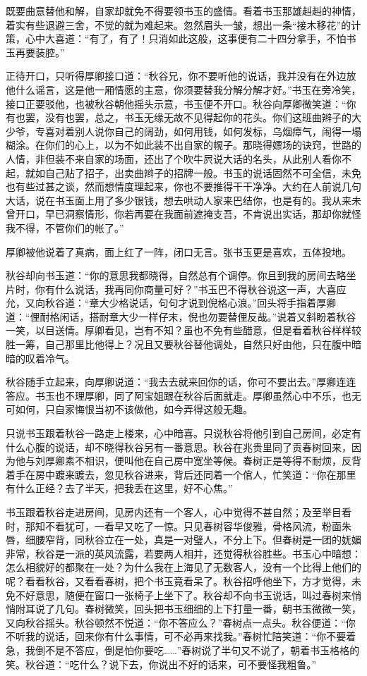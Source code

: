 \documentclass[12pt,UTF8]{ctexbook}
\begin{document}
{{{既要曲意替他和解，自家却就免不得要领书玉的盛情。看着书玉那雄赳赳的神情，着实有些退避三舍，不觉的就为难起来。忽然眉头一皱，想出一条“接木移花”的计策，心中大喜道：“有了，有了！只消如此这般，这事便有二十四分拿手，不怕书玉再要装腔。”

正待开口，只听得厚卿接口道：“秋谷兄，你不要听他的说话，我并没有在外边放他什么谣言，这是他一厢情愿的主意，你须要替我分解分解才好。”书玉在旁冷笑，接口正要驳他，也被秋谷朝他摇头示意，书玉便不开口。秋谷向厚卿微笑道：“你有也罢，没有也罢，总之，书玉无缘无故不见得起你的花头。你们这班曲辫子的大少爷，专喜对着别人说你自己的阔劲，如何用钱，如何发标，乌烟瘴气，闹得一塌糊涂。在你们的心上，以为不如此装不出自家的幌子。那晓得嫖场的诀窍，世路的人情，非但装不来自家的场面，还出了个吹牛屄说大话的名头，从此别人看你不起，就如自己贴了招子，出卖曲辫子的招牌一般。书玉的说话固然不可全信，未免也有些过甚之谈，然而想情度理起来，你也不要推得干干净净。大约在人前说几句大话，说在书玉面上用了多少银钱，想去哄动人家来巴结你，也是有的。我从来未曾开口，早已洞察情形，你若再要在我面前遮掩支吾，不肯说出实话，那却你就怪我不得，不管你们的帐了。”

厚卿被他说着了真病，面上红了一阵，闭口无言。张书玉更是喜欢，五体投地。

秋谷却向书玉道：“你的意思我都晓得，自然总有个调停。你且到我的房间去略坐片时，你有什么说话，我再同你商量可好？”书玉巴不得秋谷说这一声，大喜应允，又向秋谷道：“章大少格说话，句句才说到倪格心浪。”回头将手指着厚卿道：“俚耐格闲话，搭耐章大少一样仔末，倪也勿要替俚反哉。”说着又斜盼着秋谷一笑，以目送情。厚卿看见，岂有不知？虽也不免有些醋意，但是看着秋谷样样较胜一筹，自己那里比他得上？况且又要秋谷替他调处，自然只好由他，只在腹中暗暗的叹着冷气。

秋谷随手立起来，向厚卿说道：“我去去就来回你的话，你可不要出去。”厚卿连连答应。书玉也不理厚卿，同了阿宝姐跟在秋谷后面就走。厚卿虽然心中不乐，也无可如何，只自家悔恨当初不该做他，如今弄得这般无趣。

只说书玉跟着秋谷一路走上楼来，心中暗喜。只说秋谷将他引到自己房间，必定有什么心腹的说话，却不晓得秋谷另有一番意思。秋谷在兆贵里同了贡春树回来，因为他与刘厚卿素不相识，便叫他在自己房中宽坐等候。春树正是等得不耐烦，反背着手在房中踱来踱去，忽见秋谷进来，背后还同着一个倌人，忙笑道：“你在那里有什么正经？去了半天，把我丢在这里，好不心焦。”

书玉跟着秋谷走进房间，见房内还有一个客人，心中觉得不甚自然；及至举目看时，那知不看犹可，一看早又吃了一惊。只见春树容华俊雅，骨格风流，粉面朱唇，细腰窄背，同秋谷立在一处，真是一对璧人，不分上下。但春树是一团的妩媚非常，秋谷是一派的英风流露，若要两人相并，还觉得秋谷胜些。书玉心中暗想：怎么相貌好的都聚在一处？为什么我在上海见了无数客人，没有一个比得上他们的呢？看看秋谷，又看看春树，把个书玉竟看呆了。秋谷招呼他坐下，方才觉得，未免不好意思，随便在窗口一张椅子上坐下了。秋谷却不向书玉说话，叫过春树来悄悄附耳说了几句。春树微笑，回头把书玉细细的上下打量一番，朝书玉微微一笑，又向秋谷摇头。秋谷顿然不悦道：“你不答应么？”春树点一点头。秋谷便道：“你不听我的说话，回来你有什么事情，可不必再来找我。”春树忙陪笑道：“你不要着急，我倒不是不答应，倒是怕你要吃……”春树说了半句又不说了，朝着书玉格格的笑。秋谷道：“吃什么？说下去，你说出不好的话来，可不要怪我粗鲁。”

}}}
\end{document}
